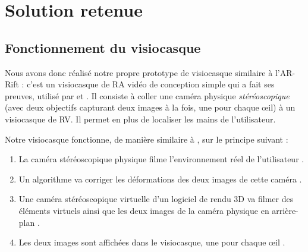 \section{Solution retenue}
\label{sec:prototype}

\subsection{Fonctionnement du visiocasque}
\label{subsec:prototype_operation}
Nous avons donc réalisé notre propre prototype de visiocasque similaire à l'AR-Rift \citep{Steptoe2013} : c'est un visiocasque de RA vidéo de conception simple qui a fait ses preuves, utilisé par \cite{Steptoe2014} et \cite{Piumsomboon2014}. Il consiste à coller une caméra physique \emph{stéréoscopique} (avec deux objectifs capturant deux images à la fois, une pour chaque \oe il) à un visiocasque de RV. Il permet en plus de localiser les mains de l'utilisateur.

Notre visiocasque fonctionne, de manière similaire à \cite{Steptoe2013}, sur le principe suivant :
\begin{enumerate}
  \item La caméra stéréoscopique physique filme l'environnement réel de l'utilisateur .
  \item Un algorithme va corriger les déformations des deux images de cette caméra .
  \item Une caméra stéréoscopique virtuelle d'un logiciel de rendu 3D va filmer des éléments virtuels ainsi que les deux images de la caméra physique en arrière-plan .
  \item Les deux images sont affichées dans le visiocasque, une pour chaque \oe il .
\end{enumerate}


